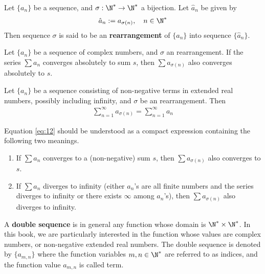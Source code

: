 \documentclass[thmcnt=section, 12pt, color=purple]{my-elegantbook}
\begin{document}

\begin{definition} \label{def:8}
	Let $\{a_n\}$ be a sequence,
	and $\sigma: \N^\ast \to \N^\ast$
	a bijection.
	Let $\hat{a}_n$ be given by 
	\begin{align*}
		\hat{a}_n := a_{\sigma(n)},
		\quad n \in \N^\ast
	\end{align*}
	Then sequence $\sigma$
	is said to be an \textbf{rearrangement}
	of $\{a_n\}$ into sequence $\{\hat{a}_n\}$.
\end{definition}


\begin{theorem} \label{thm:4}
	Let $\{a_n\}$ be a sequence of complex numbers,
	and $\sigma$ an rearrangement.
	If the series $\sum a_n$ converges absolutely to sum $s$,
	then $\sum a_{\sigma(n)}$ also converges absolutely to $s$.
\end{theorem}

\begin{corollary} \label{cor:1}
	Let $\{a_n\}$ be a sequence consisting
	of non-negative terms in extended real numbers, 
	possibly including infinity,
	and $\sigma$ be an rearrangement.
	Then 
	\begin{align}
		\sum_{n=1}^\infty a_{\sigma(n)}
		= \sum_{n=1}^\infty a_n
		\label{eq:12}
	\end{align}
\end{corollary}

\begin{note}
	Equation \eqref{eq:12} should be understood
	as a compact expression containing
	the following two meanings.
	\begin{enumerate}
		\item If $\sum a_n$ converges to a (non-negative) 
			sum $s$,
			then $\sum a_{\sigma(n)}$ also converges to $s$.
		\item If $\sum a_n$ diverges to infinity
			(either $a_n$'s are all finite numbers 
			and the series diverges to infinity
			or there exists $\infty$ among $a_n$'s),
			then $\sum a_{\sigma(n)}$ also diverges to infinity.
	\end{enumerate}
\end{note}


\begin{definition} \label{def:10}
	A \textbf{double sequence}
	is in general any function whose domain is $\N^\ast \times \N^\ast$.
	In this book, we are particularly interested in 
	the function whose values are complex numbers,
	or non-negative extended real numbers.
	The double sequence is denoted by $\{a_{m,n}\}$
	where the function variables $m, n \in \N^\ast$ 
	are referred to as indices,
	and the function value $a_{m,n}$
	is called term.
\end{definition}
\end{document}

